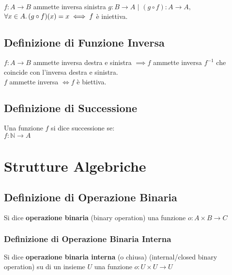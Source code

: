 \documentclass[a4paper, twoside, italian, 11pt]{book}
\newcommand{\N}{\mathbb N}
\begin{document}
$f : A \rightarrow B$ ammette inversa sinistra $g : B \rightarrow A$ $|$ $(g \circ f) : A \rightarrow A,$ $\forall x \in A \ldotp (g \circ f)(x) = x \iff f$ è iniettiva.



\section{Definizione di Funzione Inversa}

$f : A \rightarrow B$ ammette inversa destra e sinistra $\implies f$ ammette inversa $f^{-1}$ che coincide con l'inversa destra e sinistra. \\

\noindent
$f$ ammette inversa $\iff f$ è biettiva.





\section{Definizione di Successione}

Una funzione $f$ si dice successione se: \\

$f : \N \rightarrow A$



\chapter{Strutture Algebriche}



\section{Definizione di Operazione Binaria}

Si dice \textbf{operazione binaria} (binary operation) una funzione $o : A \times B \rightarrow C$


\subsection{Definizione di Operazione Binaria Interna}

Si dice \textbf{operazione binaria interna} (o chiusa) (internal/closed binary operation) su di un insieme $U$ una funzione $o : U \times U \rightarrow U$
\end{document}
